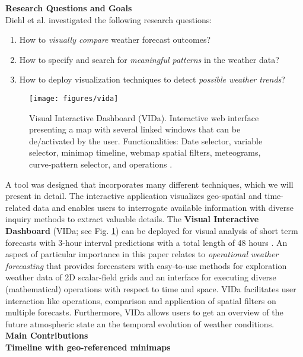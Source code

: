 \documentclass[citeauthoryear]{llncs}
\begin{document}
\newpage
\textbf{Research Questions and Goals}\ \\[0.2cm]
Diehl et al. investigated the following research questions:

\begin{enumerate}
	\item How to \textit{visually compare} weather forecast outcomes? 
	\item How to specify and search for \textit{meaningful patterns} in the weather data?
	\item How to deploy visualization techniques to detect \textit{possible weather trends}?
\end{enumerate}

\begin{figure}[t]
	\centering	
	\texttt{[image: figures/vida]} 
	\caption{{\small Visual Interactive Dashboard (VIDa). Interactive web interface presenting a map with several linked windows that can be de/activated by the user. Functionalities: Date selector, variable selector, minimap timeline, webmap spatial filters, meteograms, curve-pattern selector, and operations \cite{diehl2015visual}. \label{vida}}}
	\vspace*{-0.5cm}
\end{figure}A tool was designed that incorporates many different techniques, which we will present in detail. The interactive application visualizes geo-spatial and time-related data and enables users to interrogate available information with diverse inquiry methods to extract valuable details. The \textbf{Visual Interactive Dashboard} (VIDa; see Fig. \ref{vida}) can be deployed for visual analysis of short term forecasts with 3-hour interval predictions with a total length of 48 hours \cite{diehl2015visual}. An aspect of particular importance in this paper relates to \textit{operational weather forecasting} that provides forecasters with easy-to-use methods for exploration weather data of 2D scalar-field grids and an interface for executing diverse (mathematical) operations with respect to time and space. VIDa facilitates user interaction like operations, comparison and application of spatial filters on multiple forecasts. Furthermore, VIDa allows users to get an overview of the future atmospheric state an the temporal evolution of weather conditions.\\

\newpage
{\large\textbf{Main Contributions}}\\[0.2cm]
\textbf{Timeline with geo-referenced minimaps}\\[0.2cm]
\end{document}

